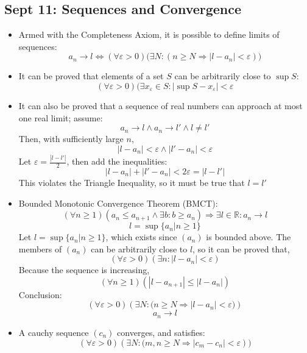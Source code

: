 \documentclass[10pt, oneside]{article}
\let\leq\leqslant
\let\geq\geqslant
\newcommand{\R}{\mathbb{R}}
\begin{document}
\subsection{Sept 11: Sequences and Convergence}
\begin{itemize}
    \item Armed with the Completeness Axiom, it is possible to define limits of sequences:
        \[a_n \rightarrow l \Leftrightarrow (\forall \varepsilon > 0) \big(\exists N : ( n \geq N \Rightarrow | l - a_n | < \varepsilon ) \big)\]
    \item It can be proved that elements of a set $S$ can be arbitrarily close to $\sup S$:
        \[(\forall \varepsilon > 0)(\exists x_\varepsilon \in S : |\sup S - x_\varepsilon | < \varepsilon\]
    \item It can also be proved that a sequence of real numbers can approach at most one real limit; assume: 
        \[a_n \rightarrow l \land a_n \rightarrow l' \land l \neq l'\]
    Then, with sufficiently large $n$,
         \[ | l - a_n | < \varepsilon \land | l' - a_n | < \varepsilon\]
    Let $\varepsilon = \frac{|l - l'|}{2}$, then add the inequalities:
        \[|l - a_n| + |l' - a_n| < 2\varepsilon = |l - l'|\]
    This violates the Triangle Inequality, so it must be true that $l = l'$
    \item Bounded Monotonic Convergence Theorem (BMCT):
        \[(\forall n \geq 1)(a_n \leq a_{n+1} \land \exists b : b \geq a_n) \Rightarrow \exists l \in \R : a_n \rightarrow l\]
        \[l = \sup \{a_n|n \geq 1\} \]
    Let $l = \sup \{a_n | n \geq 1\}$, which exists since $(a_n)$ is bounded above. The members of $(a_n)$ can be arbitrarily close to $l$, so it can be proved that, 
        \[(\forall \varepsilon > 0)(\exists n : | l - a_n | < \varepsilon)\]
    Because the sequence is increasing,
        \[(\forall n \geq 1) (| l - a_{n+1} | \leq | l - a_n |)\]
    Conclusion:
        \[(\forall \varepsilon > 0)(\exists N : \big( n \geq N \Rightarrow |l - a_n| < \varepsilon \big) )\]
        \[a_n \rightarrow l\]
    \item A cauchy sequence $(c_n)$ converges, and satisfies:
        \[(\forall \varepsilon > 0)(\exists N : \big( m,n \geq N \Rightarrow |c_m - c_n|< \varepsilon) \big)\]
\end{itemize}
\end{document}
